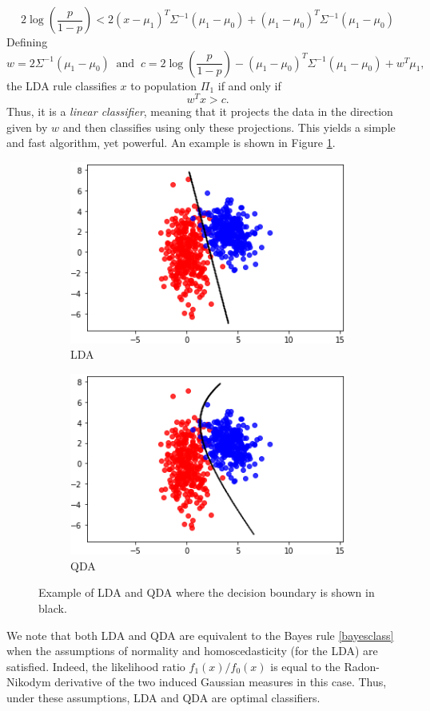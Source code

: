 \documentclass[10pt, a4paper]{report}
\theoremstyle{definition}
\theoremstyle{remark}
\begin{document}
$$2\log\left(\frac{p}{1-p}\right) < 2(x-\mu_1)^T\Sigma^{-1} (\mu_1-\mu_0) + (\mu_1-\mu_0)^T\Sigma^{-1} (\mu_1-\mu_0)$$
Defining 
$$w = 2\Sigma^{-1}(\mu_1-\mu_0) \ \text{ and } \ c = 2\log\left(\frac{p}{1-p}\right) - (\mu_1-\mu_0)^T\Sigma^{-1} (\mu_1-\mu_0) + w^T\mu_1,$$
the LDA rule classifies $x$ to population $\Pi_1$ if and only if
$$w^Tx>c.$$
Thus, it is a \emph{linear classifier}, meaning that it projects the data in the direction given by $w$ and then classifies using only these projections. This yields a simple and fast algorithm, yet powerful. An example is shown in Figure \ref{fig:LQDAex}.
\begin{figure}[H]
	\centering
	\begin{subfigure}{.5\textwidth}
		\centering
		\includegraphics[width=.8\linewidth]{Code/images/42/LDAex}
		\caption{LDA}
	\end{subfigure}%
	\begin{subfigure}{.5\textwidth}
		\centering
		\includegraphics[width=.8\linewidth]{Code/images/42/QDAex}
		\caption{QDA}
	\end{subfigure}
	\caption{Example of LDA and QDA where the decision boundary is shown in black.}
	\label{fig:LQDAex}
\end{figure}
We note that both LDA and QDA are equivalent to the Bayes rule \ref{bayesclass} when the assumptions of normality and homoscedasticity (for the LDA) are satisfied. Indeed, the likelihood ratio $f_1(x)/f_0(x)$ is equal to the Radon-Nikodym derivative of the two induced Gaussian measures in this case. Thus, under these assumptions, LDA and QDA are optimal classifiers.
\end{document}
